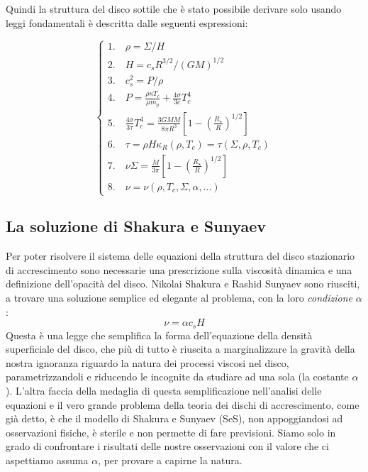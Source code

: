 \documentclass[a4paperbi]{article}
\begin{document}
	Quindi la struttura del disco sottile che è stato possibile derivare solo usando leggi fondamentali è descritta dalle seguenti espressioni:
	
	\begin{spacing}{1.3}
	\begin{equation}\label{eq:SistemaStazionario}
	\begin{cases}
		1.\quad \rho=\Sigma/H\\
		2.\quad H=c_sR^{3/2}/(GM)^{1/2}\\
		3.\quad c_s^2=P/\rho\\
		4.\quad P=\frac{\rho\kappa T_c}{\mu m_p}+\frac{4\sigma}{3c}T_c^4\\
		5.\quad \frac{4\sigma}{3\tau}T^4_c=\frac{3GM\dot{M}}{8\pi R^3}\left[1-\left(\frac{R_{\star}}{R}\right)^{1/2}\right]\\
		6.\quad \tau=\rho H\kappa_R(\rho,T_c)=\tau(\Sigma,\rho,T_c)\\
		7.\quad \nu\Sigma=\frac{\dot{M}}{3\pi}\left[1-\left(\frac{R_{\star}}{R}\right)^{1/2}\right]\\
		8.\quad \nu=\nu(\rho,T_c,\Sigma,\alpha,...)		
	\end{cases}
	\end{equation}
	\end{spacing}
		
\subsection{La soluzione di Shakura e Sunyaev}
	Per poter risolvere il sistema delle equazioni della struttura del disco stazionario di accrescimento sono necessarie una prescrizione sulla viscosità dinamica e una definizione dell'opacità del disco. Nikolai Shakura e Rashid Sunyaev sono riusciti, a trovare una soluzione semplice ed elegante al problema, con la loro \textit{condizione} $\alpha$:
	\begin{equation}
		\nu=\alpha c_sH
	\end{equation}
Questa è una legge che semplifica la forma dell'equazione della densità superficiale del disco, che più di tutto è riuscita a marginalizzare la gravità della nostra ignoranza riguardo la natura dei processi viscosi nel disco, parametrizzandoli e riducendo le incognite da studiare ad una sola (la costante $\alpha$). L'altra faccia della medaglia di questa semplificazione nell'analisi delle equazioni e il vero grande problema della teoria dei dischi di accrescimento, come già detto, è che il modello di Shakura e Sunyaev (SeS), non appoggiandosi ad osservazioni fisiche, è sterile e non permette di fare previsioni. Siamo solo in grado di confrontare i risultati delle nostre osservazioni con il valore che ci aspettiamo assuma $\alpha$, per provare a capirne la natura.
\end{document}
